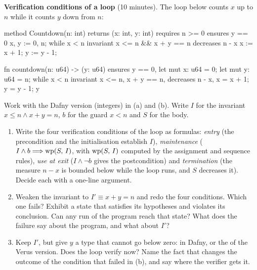 \documentclass[11pt]{article}
\begin{document}
\begin{problem}\label{prob:B2}
\textbf{Verification conditions of a loop} (10 minutes). The loop below
counts $x$ up to $n$ while it counts $y$ down from $n$:
\begin{dafnycode}
method Countdown(n: int) returns (x: int, y: int)
  requires n >= 0
  ensures y == 0
{
  x, y := 0, n;
  while x < n
    invariant x <= n && x + y == n
    decreases n - x
  {
    x := x + 1;
    y := y - 1;
  }
}
\end{dafnycode}
\begin{veruscode}
fn countdown(n: u64) -> (y: u64)
    ensures y == 0,
{
    let mut x: u64 = 0;
    let mut y: u64 = n;
    while x < n
        invariant
            x <= n,
            x + y == n,
        decreases n - x,
    {
        x = x + 1;
        y = y - 1;
    }
    y
}
\end{veruscode}
Work with the Dafny version (integers) in (a) and (b). Write $I$ for the
invariant $x \leq n \wedge x + y = n$, $b$ for the guard $x < n$ and $S$ for
the body.
\begin{enumerate}
\item[(a)] Write the four verification conditions of the loop as formulas:
  \emph{entry} (the precondition and the initialisation establish $I$),
  \emph{maintenance} ($I \wedge b \Longrightarrow \mathrm{wp}(S,\,I)$, with $\mathrm{wp}(S,\,I)$ computed by
  the assignment and sequence rules), \emph{use at exit} ($I \wedge \neg b$
  gives the postcondition) and \emph{termination} (the measure
  $n - x$ is bounded below while the loop runs, and $S$ decreases it).
  Decide each with a one-line argument.
\item[(b)] Weaken the invariant to $I' \equiv x + y = n$ and redo the four
  conditions. Which one fails? Exhibit a state that satisfies its hypotheses
  and violates its conclusion. Can any run of the program reach that state?
  What does the failure say about the program, and what about $I'$?
\item[(c)] Keep $I'$, but give $y$ a type that cannot go below zero: 
  in Dafny, or the  of the Verus version. Does the loop verify now?
  Name the fact that changes the outcome of the condition that failed in (b),
  and say where the verifier gets it.
\end{enumerate}
\end{problem}
\end{document}
